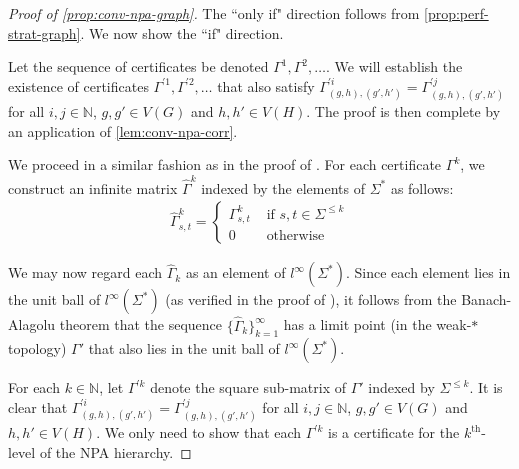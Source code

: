 \documentclass[a4paper,onecolumn,11pt,accepted=2026-01-06]{quantumarticle}
\theoremstyle{plain}
\theoremstyle{remark}
\theoremstyle{definition}
\begin{document}
\begin{proof}[Proof of \ref{prop:conv-npa-graph}]
    The ``only if" direction follows from \cref{prop:perf-strat-graph}. We now show the ``if" direction. 

    Let the sequence of certificates be denoted $\Gamma^1, \Gamma^2, \dots$. We will establish the existence of certificates $\Gamma^{'1}, \Gamma^{'2}, \dots$ that also satisfy $\Gamma^{'i}_{(g,h), (g',h')}=  \Gamma^{'j}_{(g,h), (g',h')}$ for all $i, j \in \mathbb{N}$, $g,g' \in V(G)$ and $h,h' \in V(H)$. The proof is then complete by an application of \cref{lem:conv-npa-corr}. 

    We proceed in a similar fashion as in the proof of \cite[Corollary 2]{russell_synchronous_2023}. For each certificate $\Gamma^k$, we construct an infinite matrix $\widehat{\Gamma}^k$ indexed by the elements of $\Sigma^*$ as follows: 
    \begin{align*}
        \widehat{\Gamma}^k_{s, t} = \begin{cases}
            \Gamma^k_{s,t} & \text{ if } s,t \in \Sigma^{\leq k} \\
            0 & \text{ otherwise }
        \end{cases}
    \end{align*}


    We may now regard each $\widehat{\Gamma}_k$ as an element of $l^{\infty}(\Sigma^*)$. Since each element lies in the unit ball of $l^{\infty}(\Sigma^*)$ (as verified in the proof of \cite[Corollary 2]{russell_synchronous_2023}), it follows from the Banach-Alagolu theorem that the sequence $\{\widehat{\Gamma}_k\}_{k = 1}^{\infty}$ has a limit point (in the weak-$*$ topology) $\Gamma'$ that also lies in the unit ball of $l^{\infty}(\Sigma^*)$. 

    For each $k \in \mathbb{N}$, let $\Gamma^{'k}$ denote the square sub-matrix of $\Gamma'$ indexed by $\Sigma^{\leq k}$. It is clear that $\Gamma^{'i}_{(g,h), (g',h')}=  \Gamma^{'j}_{(g,h), (g',h')}$ for all $i, j \in \mathbb{N}$, $g,g' \in V(G)$ and $h,h' \in V(H)$. We only need to show that each $\Gamma^{'k}$ is a certificate for the $k^{\text{th}}$-level of the NPA hierarchy. 


\end{proof}
\end{document}
